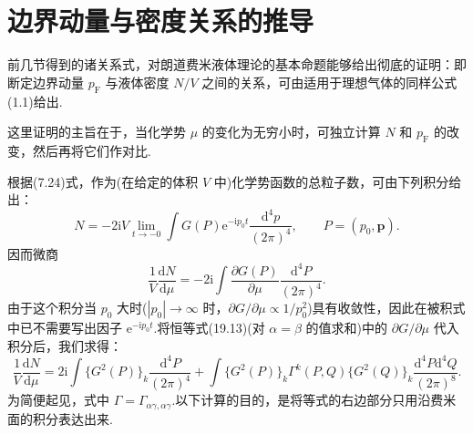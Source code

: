 \section{边界动量与密度关系的推导}

前几节得到的诸关系式，对朗道费米液体理论的基本命题能够给出彻底的证明：即断定边界动量 $p_{\mathrm{F}}$ 与液体密度 $N/V$ 之间的关系，可由适用于理想气体的同样公式(1.1)给出.

这里证明的主旨在于，当化学势 $\mu$ 的变化为无穷小时，可独立计算 $N$ 和 $p_{\mathrm{F}}$ 的改变，然后再将它们作对比.

根据(7.24)式，作为(在给定的体积 $V$ 中)化学势函数的总粒子数，可由下列积分给出：
\begin{equation}
  N=-2\mathrm{i}V\lim_{t\to-0}\int G(P)\mathrm{e}^{-\mathrm{i}p_0t}\frac{\mathrm{d}^4p}{(2\pi)^4},\qquad P=(p_0,\bm{p}).
\end{equation}
因而微商
\begin{equation}
  \frac{1}{V}\frac{\mathrm{d}N}{\mathrm{d}\mu}=-2\mathrm{i}\int\frac{\partial G(P)}{\partial\mu}\frac{\mathrm{d}^4P}{(2\pi)^4}.
\end{equation}
由于这个积分当 $p_0$ 大时($|p_0|\to\infty$ 时，$\partial G/\partial\mu\propto1/p_0^2$)具有收敛性，因此在被积式中已不需要写出因子 $\mathrm{e}^{-\mathrm{i}p_0t}$.将恒等式(19.13)(对 $\alpha=\beta$ 的值求和)中的 $\partial G/\partial\mu$ 代入积分后，我们求得：
\begin{equation*}
  \frac{1}{V}\frac{\mathrm{d}N}{\mathrm{d}\mu}=2\mathrm{i}\int\bigl\{G^2(P)\bigr\}_{k}\frac{\mathrm{d}^4P}{(2\pi)^4}
  +\int\bigl\{G^2(P)\bigr\}_{k}\Gamma^{k}(P,Q)\bigl\{G^2(Q)\bigr\}_{k}\frac{\mathrm{d}^4P\mathrm{d}^4Q}{(2\pi)^8}.
\end{equation*}
为简便起见，式中 $\Gamma=\Gamma_{\alpha\gamma,\alpha\gamma}$.以下计算的目的，是将等式的右边部分只用沿费米面的积分表达出来.

